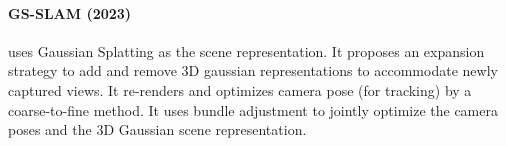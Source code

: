 
\paragraph{GS-SLAM (2023) \cite{Yan2023GSSLAMDV}} uses Gaussian
Splatting \cite{Kerbl20233DGS} as the scene representation. It
proposes an expansion strategy to add and remove 3D gaussian
representations to accommodate newly captured views. It re-renders and
optimizes camera pose (for tracking) by a coarse-to-fine method. It
uses bundle adjustment to jointly optimize the camera poses and the
3D Gaussian scene representation.




